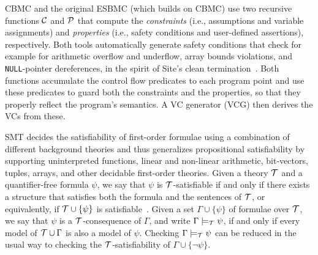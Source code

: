 \documentclass[conference]{IEEEtran}
\begin{document}
CBMC and the original ESBMC (which builds on CBMC) use two recursive functions
$\cal C$ and $\cal P$ that compute the \emph{constraints}
(i.e., assumptions and variable assignments) and
\emph{properties} (i.e., safety conditions and user-defined
assertions), respectively. Both tools automatically generate safety conditions
that check for example for arithmetic overflow and underflow, array bounds
violations, and \verb|NULL|-pointer dereferences, in the spirit of Site's clean
termination~\cite{Sites74}. Both functions accumulate the control flow
predicates to each program point and use these predicates to guard both
the constraints and the properties, so that they properly reflect the
program's semantics. A VC generator (VCG) then derives the VCs from
these.

\smallskip{}
%
SMT decides the satisfiability of first-order formulae using a
combination of different background theories and thus generalizes
propositional satisfiability by supporting uninterpreted functions,
linear and non-linear arithmetic, bit-vectors, tuples, arrays, and other
decidable first-order theories. Given a theory ${\cal T}$ and a
quantifier-free formula $\psi$, we say that $\psi$ is $\cal
T$-satisfiable if and only if there exists a structure that satisfies
both the formula and the sentences of ${\cal T}$, or equivalently, if
${\cal T}\cup \{\psi\}$ is satisfiable~\cite{Bradley07}. Given a set
$\Gamma\cup \{\psi\}$ of formulae over $\cal T$, we say that $\psi$ is a
$\cal T$-consequence of $\Gamma$, and write $\Gamma\models_{\cal
T}\psi$, if and only if every model of ${\cal T}\cup\Gamma$ is also a
model of $\psi$.  Checking $\Gamma\models_{\cal T}\psi$ can be reduced
in the usual way to checking the $\cal T$-satisfiability of
$\Gamma\cup\{\neg\psi\}$.
\end{document}
